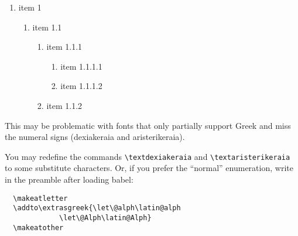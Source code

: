 \documentclass[a4paper]{article}
\begin{document}
\begin{enumerate}
  \item item 1
  \begin{enumerate}
    \item item 1.1
    \begin{enumerate}
      \item item 1.1.1
       \begin{enumerate}
         \item item 1.1.1.1
         \item item 1.1.1.2
       \end{enumerate}
      \item item 1.1.2
    \end{enumerate}
  \end{enumerate}
\end{enumerate}


This may be problematic with fonts that only partially support Greek and
miss the numeral signs (dexiakeraia and aristerikeraia).

You may redefine the commands \verb+\textdexiakeraia+ and
\verb+\textaristerikeraia+ to some substitute characters.
Or, if you prefer the ``normal'' enumeration, write in the preamble after
loading babel:

\begin{verbatim}
  \makeatletter
  \addto\extrasgreek{\let\@alph\latin@alph
  		     \let\@Alph\latin@Alph}
  \makeatother
\end{verbatim}
\end{document}
